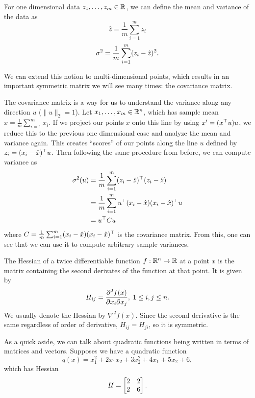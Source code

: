 \documentclass[11 pt]{scrartcl}
\begin{document}
\begin{example}
    \label{ex:cov}
    For one dimensional data $z_1, \dots, z_m\in \mathbb R$, we can define the mean and variance of the data as 
    \[ \hat{z} = \frac{1}{m} \sum_{i=1}^m z_i \] 
    \[ \sigma^2 = \frac{1}{m} \sum_{i=1}^m (z_i-\hat{z})^2.\] 
    
    We can extend this notion to multi-dimensional points, which results in an important symmetric matrix we will see many times: the covariance matrix. 
    
    The covariance matrix is a way for us to understand the variance along any direction $u$ ($\|u\|_2=1$). 
    Let $x_1, \dots, x_m \in \mathbb R^n$, which has sample mean $\hat{x} = \frac 1m \sum_{i=1}^m x_i$. 
    If we project our points $x$ onto this line by using $x' = (x^\top u)u$, we reduce this to the previous one dimensional case and analyze the mean and variance again.
    This creates ``scores'' of our points along the line $u$ defined by $z_i = (x_i-\hat{x})^\top u$. 
    Then following the same procedure from before, we can compute variance as 
    \begin{align*}
        \sigma^2(u) &= \frac{1}{m}\sum_{i=1}^m (z_i - \hat{z})^\top (z_i-\hat{z}) \\ 
                 &= \frac{1}{m}\sum_{i=1}^m u^\top (x_i-\hat{x}) (x_i-\hat{x})^\top u  \\ 
                 &= u^\top C u
    \end{align*}
    where $C= \frac{1}{m}\sum_{i=1}^m (x_i-\hat{x}) (x_i-\hat{x})^\top$ is the covariance matrix.
    From this, one can see that we can use it to compute arbitrary sample variances.
\end{example}

\begin{example}
    The Hessian of a twice differentiable function $f: \mathbb R^n \to \mathbb R$ at a point $x$ is the matrix containing the second derivates of the function at that point. 
    It is given by 
    \[ H_{ij} = \dfrac{\partial^2 f(x)}{\partial x_i \partial x_j}, \; 1\leq i,j\leq n.\] 
    We usually denote the Hessian by $\nabla^2 f(x)$. 
    Since the second-derivative is the same regardless of order of derivative, $H_{ij} = H_{ji}$, so it is symmetric. 
\end{example}

As a quick aside, we can talk about quadratic functions being written in terms of matrices and vectors. 
Supposes we have a quadratic function 
\[ q(x) = x_1^2 + 2x_1x_2 + 3x_2^2 + 4x_1 + 5x_2+6,\]
which has Hessian 
\[ H = \begin{bmatrix} 2&2 \\ 2 & 6 \end{bmatrix}.\] 
\end{document}
